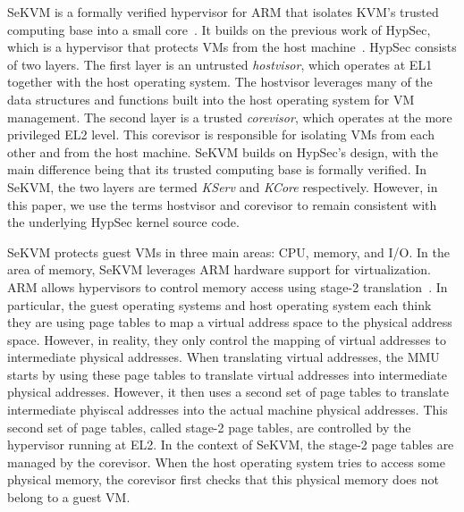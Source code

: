 SeKVM is a formally verified hypervisor for ARM that isolates KVM's trusted computing
base into a small core~\cite{sekvm}. It builds on the previous work of HypSec,
which is a hypervisor that protects VMs from the host machine~\cite{hypsec}.
HypSec consists of two layers. The first layer is an untrusted
\textit{hostvisor}, which operates at EL1 together with the host operating
system. The hostvisor leverages many of the data structures and functions
built into the host operating system for VM management. The second layer is a
trusted \textit{corevisor}, which operates at the more privileged EL2 level.
This corevisor is responsible for isolating VMs from each other and from the
host machine. SeKVM builds on HypSec's design, with the main difference being
that its trusted computing base is formally verified. In SeKVM, the two layers
are termed \textit{KServ} and \textit{KCore} respectively. However, in this
paper, we use the terms hostvisor and corevisor to remain
consistent with the underlying HypSec kernel source code.

SeKVM protects guest VMs in three main areas: CPU, memory, and I/O. In the
area of memory, SeKVM leverages ARM hardware support for virtualization. ARM
allows hypervisors to control memory access using stage-2
translation~\cite{arm}. In particular, the guest operating systems and host
operating system each think they are using page tables to map a virtual address space to the
physical address space. However, in reality, they only control the mapping
of virtual addresses to intermediate physical addresses. When translating
virtual addresses, the MMU starts by using these page tables to translate
virtual addresses into intermediate physical addresses. However, it then 
uses a second set of page tables to translate
intermediate phyiscal addresses into the actual machine physical addresses.
This second set of page tables, called stage-2 page tables, are controlled by
the hypervisor running at EL2. In the context of SeKVM, the stage-2 page tables
are managed by the corevisor. When the host operating system tries to
access some physical memory, the corevisor first checks that this
physical memory does not belong to a guest VM.

